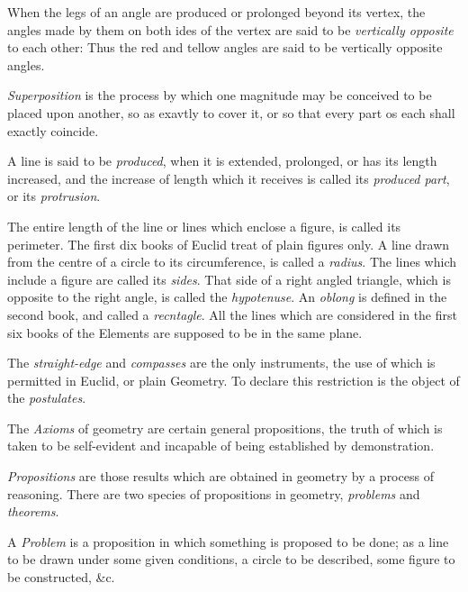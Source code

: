         When the legs of an angle are produced or prolonged beyond its vertex, the 
        angles made by them on both ides of the vertex are said to be 
        \textit{vertically opposite} to each other: Thus the red and tellow angles 
        are said to be vertically opposite angles. 

        \textit{Superposition} is the process by which one magnitude may 
        be conceived to be placed upon another, so as exavtly to cover it, 
        or so that every part os each shall exactly coincide. 

        A line is said to be \textit{produced}, when it is extended, 
        prolonged, or has its length increased, and the increase of length 
        which it receives is called its \textit{produced part}, or its 
        \textit{protrusion}. 

        The entire length of the line or lines which enclose a figure, is 
        called its perimeter. The first dix books of Euclid treat of plain 
        figures only. A line drawn from the centre of a circle to its 
        circumference, is called a \textit{radius}. The lines which 
        include a figure are called its \textit{sides}. That side of a 
        right angled triangle, which is opposite to the right angle, is 
        called the \textit{hypotenuse}. An \textit{oblong} is defined in 
        the second book, and called a \textit{recntagle}. All the lines 
        which are considered in the first six books of the Elements are 
        supposed to be in the same plane. 

        The \textit{straight-edge} and \textit{compasses} are the only 
        instruments, the use of which is permitted in Euclid, or plain 
        Geometry. To declare this restriction is the object of the 
        \textit{postulates}. 

        The \textit{Axioms} of geometry are certain general propositions, 
        the truth of which is taken to be self-evident and incapable of 
        being established by demonstration. 

        \textit{Propositions} are those results which are obtained in 
        geometry by a process of reasoning. There are two species of 
        propositions in geometry, \textit{problems} and \textit{theorems}. 

        A \textit{Problem} is a proposition in which something is proposed 
        to be done; as a line to be drawn under some given conditions, a 
        circle to be described, some figure to be constructed, \&c. 

